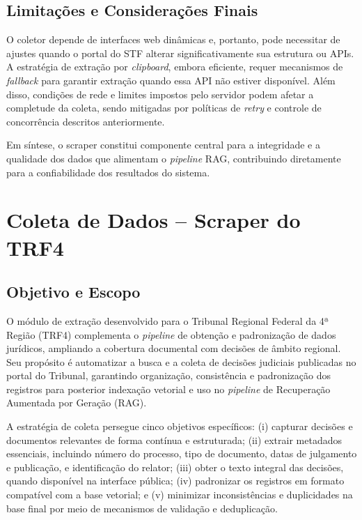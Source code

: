 \subsection{Limitações e Considerações Finais}
O coletor depende de interfaces web dinâmicas e, portanto, pode necessitar de ajustes quando o portal do STF alterar significativamente sua estrutura ou APIs. A estratégia de extração por \textit{clipboard}, embora eficiente, requer mecanismos de \textit{fallback} para garantir extração quando essa API não estiver disponível. Além disso, condições de rede e limites impostos pelo servidor podem afetar a completude da coleta, sendo mitigadas por políticas de \textit{retry} e controle de concorrência descritos anteriormente.

Em síntese, o scraper constitui componente central para a integridade e a qualidade dos dados que alimentam o \textit{pipeline} RAG, contribuindo diretamente para a confiabilidade dos resultados do sistema.

\section{Coleta de Dados -- Scraper do TRF4}
\label{sec:trf4_scraper}

\subsection{Objetivo e Escopo}
O módulo de extração desenvolvido para o Tribunal Regional Federal da 4ª Região (TRF4) complementa o \textit{pipeline} de obtenção e padronização de dados jurídicos, ampliando a cobertura documental com decisões de âmbito regional. Seu propósito é automatizar a busca e a coleta de decisões judiciais publicadas no portal do Tribunal, garantindo organização, consistência e padronização dos registros para posterior indexação vetorial e uso no \textit{pipeline} de Recuperação Aumentada por Geração (RAG).

A estratégia de coleta persegue cinco objetivos específicos: (i) capturar decisões e documentos relevantes de forma contínua e estruturada; (ii) extrair metadados essenciais, incluindo número do processo, tipo de documento, datas de julgamento e publicação, e identificação do relator; (iii) obter o texto integral das decisões, quando disponível na interface pública; (iv) padronizar os registros em formato compatível com a base vetorial; e (v) minimizar inconsistências e duplicidades na base final por meio de mecanismos de validação e deduplicação.

